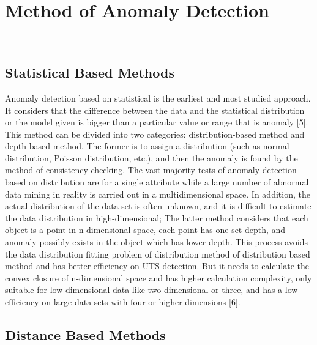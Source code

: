 \section{Method of Anomaly Detection}~\label{sec-method}
\subsection{Statistical Based Methods}
Anomaly detection based on statistical is the earliest and
most studied approach.
It considers that the difference
between the data and the statistical distribution or the model
given is bigger than a particular value or range that is
anomaly [5].
This method can be divided into two
categories: distribution-based method and depth-based
method.
The former is to assign a distribution (such as
normal distribution,
Poisson distribution,
etc.),
and then the anomaly is found by the method of consistency checking.
The vast majority tests of anomaly detection based on
distribution are for a single attribute while a large number
of abnormal data mining in reality is carried out in a
multidimensional space.
In addition,
the actual distribution
of the data set is often unknown,
and it is difficult to
estimate the data distribution in high-dimensional; The
latter method considers that each object is a point in
n-dimensional space,
each point has one set depth,
and anomaly possibly exists in the object which has lower depth.
This process avoids the data distribution fitting problem of
distribution method of distribution based method and has
better efficiency on UTS detection.
But it needs to calculate
the convex closure of n-dimensional space and has higher
calculation complexity,
only suitable for low dimensional
data like two dimensional or three,
and has a low efficiency
on large data sets with four or higher dimensions [6].

\subsection{Distance Based Methods}

